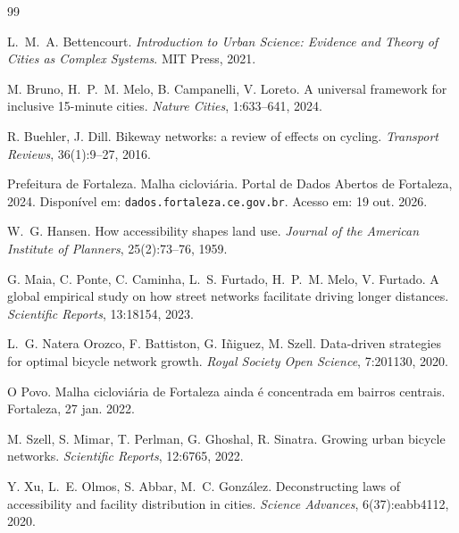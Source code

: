 \documentclass[10pt,twoside,a4paper]{article}
\begin{document}
\begin{thebibliography}{99}
\small

  L.~M.~A. Bettencourt.
  \emph{Introduction to Urban Science: Evidence and Theory of Cities as Complex Systems}.
  MIT Press, 2021.

  M. Bruno, H.~P.~M. Melo, B. Campanelli, V. Loreto.
  A universal framework for inclusive 15-minute cities.
  \emph{Nature Cities}, 1:633--641, 2024.

  R. Buehler, J. Dill.
  Bikeway networks: a review of effects on cycling.
  \emph{Transport Reviews}, 36(1):9--27, 2016.

  Prefeitura de Fortaleza.
  Malha cicloviária. Portal de Dados Abertos de Fortaleza, 2024.
  Disponível em: \texttt{dados.fortaleza.ce.gov.br}. Acesso em: 19 out. 2026.

  W.~G. Hansen.
  How accessibility shapes land use.
  \emph{Journal of the American Institute of Planners}, 25(2):73--76, 1959.

  G. Maia, C. Ponte, C. Caminha, L.~S. Furtado, H.~P.~M. Melo, V. Furtado.
  A global empirical study on how street networks facilitate driving longer distances.
  \emph{Scientific Reports}, 13:18154, 2023.

  L.~G. Natera Orozco, F. Battiston, G. Iñiguez, M. Szell.
  Data-driven strategies for optimal bicycle network growth.
  \emph{Royal Society Open Science}, 7:201130, 2020.

  O Povo.
  Malha cicloviária de Fortaleza ainda é concentrada em bairros centrais.
  Fortaleza, 27 jan. 2022.

  M. Szell, S. Mimar, T. Perlman, G. Ghoshal, R. Sinatra.
  Growing urban bicycle networks.
  \emph{Scientific Reports}, 12:6765, 2022.

  Y. Xu, L.~E. Olmos, S. Abbar, M.~C. González.
  Deconstructing laws of accessibility and facility distribution in cities.
  \emph{Science Advances}, 6(37):eabb4112, 2020.

\end{thebibliography}
\end{document}
